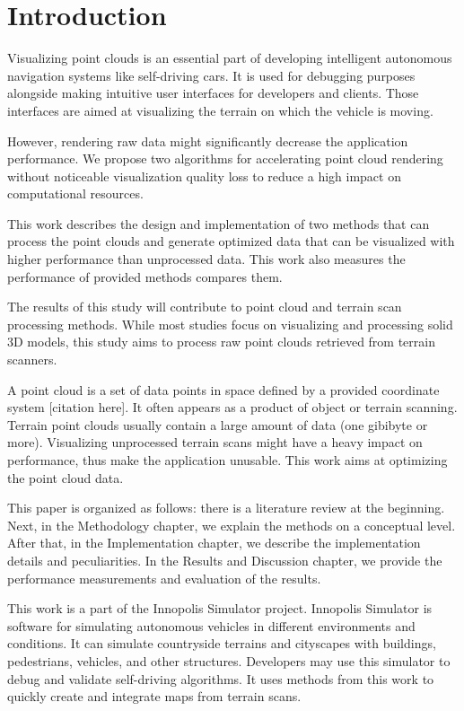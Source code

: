 \chapter{Introduction}
\label{chap:introduction}

Visualizing point clouds is an essential part of developing intelligent autonomous navigation systems like self-driving cars. It is used for debugging purposes alongside making intuitive user interfaces for developers and clients. Those interfaces are aimed at visualizing the terrain on which the vehicle is moving.

However, rendering raw data might significantly decrease the application performance. We propose two algorithms for accelerating point cloud rendering without noticeable visualization quality loss to reduce a high impact on computational resources.

This work describes the design and implementation of two methods that can process the point clouds and generate optimized data that can be visualized with higher performance than unprocessed data. This work also measures the performance of provided methods compares them.

The results of this study will contribute to point cloud and terrain scan processing methods. While most studies focus on visualizing and processing solid 3D models, this study aims to process raw point clouds retrieved from terrain scanners.

A point cloud is a set of data points in space defined by a provided coordinate system [citation here]. It often appears as a product of object or terrain scanning. Terrain point clouds usually contain a large amount of data (one gibibyte or more). Visualizing unprocessed terrain scans might have a heavy impact on performance, thus make the application unusable. This work aims at optimizing the point cloud data.

This paper is organized as follows: there is a literature review at the beginning. Next, in the Methodology chapter, we explain the methods on a conceptual level. After that, in the Implementation chapter, we describe the implementation details and peculiarities. In the Results and Discussion chapter, we provide the performance measurements and evaluation of the results.

This work is a part of the Innopolis Simulator project. Innopolis Simulator is software for simulating autonomous vehicles in different environments and conditions. It can simulate countryside terrains and cityscapes with buildings, pedestrians, vehicles, and other structures. Developers may use this simulator to debug and validate self-driving algorithms. It uses methods from this work to quickly create and integrate maps from terrain scans.
